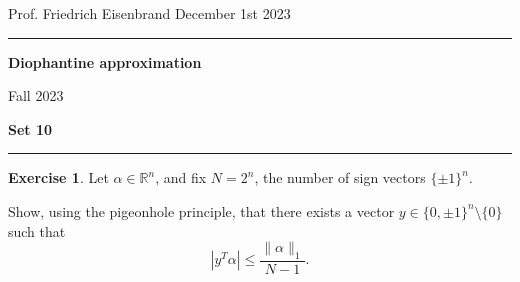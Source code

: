 \documentclass[12pt,a4paper]{article}
\date{}
\theoremstyle{plain}
\newtheorem*{Sol*}{Solution}
\theoremstyle{definition}
\newtheorem{Ex}{Exercise}
\def \R {\mathbb R}
\newif\ifsolutions
\newcommand{\exercise}[2]{
			\begin{Ex} #1 \end{Ex}
			\ifsolutions  \begin{Sol*} #2 \end{Sol*} \bigskip \else \bigskip  \fi
		}
\begin{document}
\begin{center}
{Prof. Friedrich Eisenbrand \hfill December 1st 2023}
\end{center}
	
\hrule\vspace{\baselineskip}

\begin{center}
\textbf{Diophantine approximation}

Fall 2023

\bigskip

\textbf{Set 10}
\ifsolutions{\textbf{- Solutions}} \else{} \fi
\end{center}

\hrule\vspace{\baselineskip}




\exercise{
	Let $\alpha \in \R^n$, and fix $N=2^n$, the number of sign vectors $\{\pm1\}^n$.

	Show, using the pigeonhole principle, that there exists a vector $y \in \{ 0, \pm 1\}^n \setminus \{ 0\}$ such that
		\[ | y^T \alpha | \leq \frac{\| \alpha \|_1 }{N - 1}. \]
}{}
\end{document}
